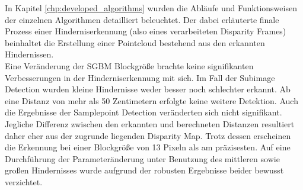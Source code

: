 \noindent
In Kapitel \ref{chp:developed_algorithms} wurden die Abläufe und Funktionsweisen der einzelnen Algorithmen detailliert beleuchtet. Der dabei erläuterte finale Prozess einer Hinderniserkennung (also eines verarbeiteten Disparity Frames) beinhaltet die Erstellung einer Pointcloud bestehend aus den erkannten Hindernissen.\\

\noindent
Eine Veränderung der SGBM Blockgröße brachte keine signifikanten Verbesserungen in der Hinderniserkennung mit sich. Im Fall der Subimage Detection wurden kleine Hindernisse weder besser noch schlechter erkannt. Ab eine Distanz von mehr als 50 Zentimetern erfolgte keine weitere Detektion. Auch die Ergebnisse der Samplepoint Detection veränderten sich nicht signifikant. Jegliche Differenz zwischen den erkannten und berechneten Distanzen resultiert daher eher aus der zugrunde liegenden Disparity Map. Trotz dessen erscheinen die Erkennung bei einer Blockgröße von 13 Pixeln als am präzisesten. Auf eine Durchführung der Parameteränderung unter Benutzung des mittleren sowie großen Hindernisses wurde aufgrund der robusten Ergebnisse beider bewusst verzichtet.



	
% 